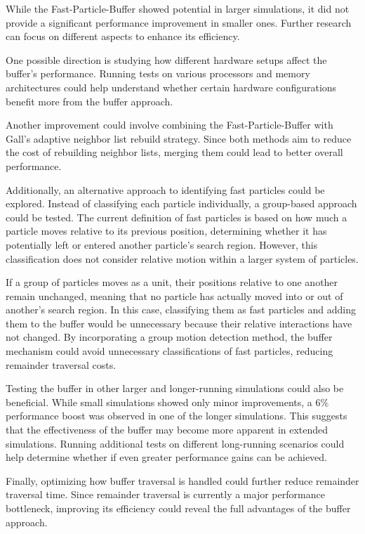 
While the Fast-Particle-Buffer showed potential in larger simulations, it did not provide a significant performance improvement in smaller ones. Further research can focus on different aspects to enhance its efficiency.

One possible direction is studying how different hardware setups affect the buffer's performance. Running tests on various processors and memory architectures could help understand whether certain hardware configurations benefit more from the buffer approach.

Another improvement could involve combining the Fast-Particle-Buffer with Gall's adaptive neighbor list rebuild strategy. Since both methods aim to reduce the cost of rebuilding neighbor lists, merging them could lead to better overall performance.


Additionally, an alternative approach to identifying fast particles could be explored. Instead of classifying each particle individually, a group-based approach could be tested. The current definition of fast particles is based on how much a particle moves relative to its previous position, determining whether it has potentially left or entered another particle's search region. However, this classification does not consider relative motion within a larger system of particles.

If a group of particles moves as a unit, their positions relative to one another remain unchanged, meaning that no particle has actually moved into or out of another's search region. In this case, classifying them as fast particles and adding them to the buffer would be unnecessary because their relative interactions have not changed. By incorporating a group motion detection method, the buffer mechanism could avoid unnecessary classifications of fast particles, reducing remainder traversal costs. 


Testing the buffer in other larger and longer-running simulations could also be beneficial. While small simulations showed only minor improvements, a 6\% performance boost was observed in one of the longer simulations. This suggests that the effectiveness of the buffer may become more apparent in extended simulations. Running additional tests on different long-running scenarios could help determine whether if even greater performance gains can be achieved.

Finally, optimizing how buffer traversal is handled could further reduce remainder traversal time. Since remainder traversal is currently a major performance bottleneck, improving its efficiency could reveal the full advantages of the buffer approach.
